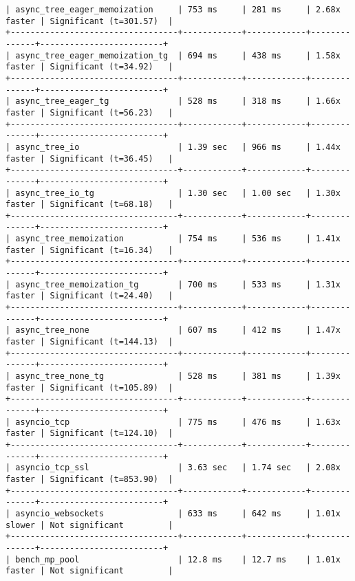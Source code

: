 \begin{code}
\begin{verbatim}
| async_tree_eager_memoization     | 753 ms     | 281 ms     | 2.68x faster | Significant (t=301.57)  |
+----------------------------------+------------+------------+--------------+-------------------------+
| async_tree_eager_memoization_tg  | 694 ms     | 438 ms     | 1.58x faster | Significant (t=34.92)   |
+----------------------------------+------------+------------+--------------+-------------------------+
| async_tree_eager_tg              | 528 ms     | 318 ms     | 1.66x faster | Significant (t=56.23)   |
+----------------------------------+------------+------------+--------------+-------------------------+
| async_tree_io                    | 1.39 sec   | 966 ms     | 1.44x faster | Significant (t=36.45)   |
+----------------------------------+------------+------------+--------------+-------------------------+
| async_tree_io_tg                 | 1.30 sec   | 1.00 sec   | 1.30x faster | Significant (t=68.18)   |
+----------------------------------+------------+------------+--------------+-------------------------+
| async_tree_memoization           | 754 ms     | 536 ms     | 1.41x faster | Significant (t=16.34)   |
+----------------------------------+------------+------------+--------------+-------------------------+
| async_tree_memoization_tg        | 700 ms     | 533 ms     | 1.31x faster | Significant (t=24.40)   |
+----------------------------------+------------+------------+--------------+-------------------------+
| async_tree_none                  | 607 ms     | 412 ms     | 1.47x faster | Significant (t=144.13)  |
+----------------------------------+------------+------------+--------------+-------------------------+
| async_tree_none_tg               | 528 ms     | 381 ms     | 1.39x faster | Significant (t=105.89)  |
+----------------------------------+------------+------------+--------------+-------------------------+
| asyncio_tcp                      | 775 ms     | 476 ms     | 1.63x faster | Significant (t=124.10)  |
+----------------------------------+------------+------------+--------------+-------------------------+
| asyncio_tcp_ssl                  | 3.63 sec   | 1.74 sec   | 2.08x faster | Significant (t=853.90)  |
+----------------------------------+------------+------------+--------------+-------------------------+
| asyncio_websockets               | 633 ms     | 642 ms     | 1.01x slower | Not significant         |
+----------------------------------+------------+------------+--------------+-------------------------+
| bench_mp_pool                    | 12.8 ms    | 12.7 ms    | 1.01x faster | Not significant         |

\end{verbatim}
\end{code}
